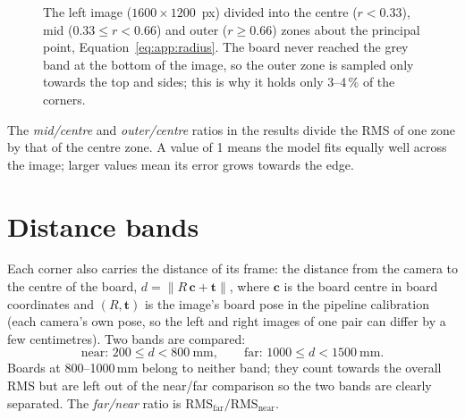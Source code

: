 \begin{figure}[H]
\centering
{}
\caption{The left image ($1600\times1200$~px) divided into the centre ($r<0.33$), mid ($0.33\le r<0.66$) and
outer ($r\ge0.66$) zones about the principal point, Equation~\eqref{eq:app:radius}. The board never reached the
grey band at the bottom of the image, so the outer zone is sampled only towards the top and sides; this is why
it holds only 3--4\,\% of the corners.}
\label{fig:app:zones}
\end{figure}

The \emph{mid/centre} and \emph{outer/centre} ratios in the results divide the RMS of one zone by that of the
centre zone. A value of 1 means the model fits equally well across the image; larger values mean its error grows
towards the edge.

\section{Distance bands}
\label{app:heldout:bands}

Each corner also carries the distance of its frame: the distance from the camera to the centre of the board,
$d = \lVert R\,\mathbf{c} + \mathbf{t} \rVert$, where $\mathbf{c}$ is the board centre in board coordinates and
$(R, \mathbf{t})$ is the image's board pose in the pipeline calibration (each camera's own pose, so the left and
right images of one pair can differ by a few centimetres). Two bands are compared:
\begin{equation}
  \text{near: } 200 \le d < 800~\text{mm}, \qquad \text{far: } 1000 \le d < 1500~\text{mm}.
\end{equation}
Boards at 800--1000\,mm belong to neither band; they count towards the overall RMS but are left out of the
near/far comparison so the two bands are clearly separated. The \emph{far/near} ratio is
$\mathrm{RMS}_\text{far} / \mathrm{RMS}_\text{near}$.

